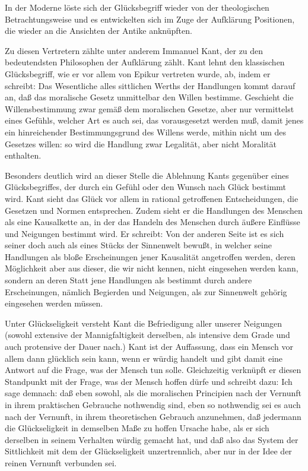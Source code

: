 In der Moderne löste sich der Glücksbegriff wieder von der theologischen Betrachtungsweise und es entwickelten sich im Zuge der Aufklärung Positionen, die wieder an die Ansichten der Antike anknüpften. 

Zu diesen Vertretern zählte unter anderem Immanuel Kant, der zu den bedeutendsten Philosophen der Aufklärung zählt. 
Kant lehnt den klassischen Glücksbegriff, wie er vor allem von Epikur vertreten wurde, ab, indem er schreibt: \glqq Das Wesentliche alles sittlichen Werths der Handlungen kommt darauf an, daß das moralische Gesetz unmittelbar den Willen bestimme. 
Geschieht die Willensbestimmung zwar gemäß dem moralischen Gesetze, aber nur vermittelst eines Gefühls, welcher Art es auch sei, das vorausgesetzt werden muß, damit jenes ein hinreichender Bestimmungsgrund des Willens werde, mithin nicht um des Gesetzes willen: so wird die Handlung zwar Legalität, aber nicht Moralität enthalten.\grqq{}\cite[S.\,71]{IK74}

Besonders deutlich wird an dieser Stelle die Ablehnung Kants gegenüber eines Glücksbegriffes, der durch ein Gefühl oder den Wunsch nach Glück bestimmt wird. 
Kant sieht das Glück vor allem in rational getroffenen Entscheidungen, die Gesetzen und Normen entsprechen. 
Zudem sieht er die Handlungen des Menschen als eine Kausalkette an, in der das Handeln des Menschen durch äußere Einflüsse und Neigungen bestimmt wird. 
Er schreibt: \glqq Von der anderen Seite ist es sich seiner doch auch als eines Stücks der Sinnenwelt bewußt, in welcher seine Handlungen als bloße Erscheinungen jener Kausalität angetroffen werden, deren Möglichkeit aber aus dieser, die wir nicht kennen, nicht eingesehen werden kann, sondern an deren Statt jene Handlungen als bestimmt durch andere Erscheinungen, nämlich Begierden und Neigungen, als zur Sinnenwelt gehörig eingesehen werden müssen.\grqq{}\cite[S.\,79f]{IK65}

Unter Glückseligkeit versteht Kant \glqq die Befriedigung aller unserer Neigungen (sowohl extensive der Mannigfaltigkeit derselben, als intensive dem Grade und auch protensive der Dauer nach.)\grqq{}\cite[S.\,523]{IK73} 
Kant ist der Auffassung, dass ein Mensch vor allem dann glücklich sein kann, wenn er würdig handelt und gibt damit eine Antwort auf die Frage, was der Mensch tun solle. 
Gleichzeitig verknüpft er diesen Standpunkt mit der Frage, was der Mensch hoffen dürfe und schreibt dazu: \glqq Ich sage demnach: daß eben sowohl, als die moralischen Principien nach der Vernunft in ihrem praktischen Gebrauche nothwendig sind, eben so nothwendig sei es auch nach der Vernunft, in ihrem theoretischen Gebrauch anzunehmen, daß jedermann die Glückseligkeit in demselben Maße zu hoffen Ursache habe, als er sich derselben in seinem Verhalten würdig gemacht hat, und daß also das System der Sittlichkeit mit dem der Glückseligkeit unzertrennlich, aber nur in der Idee der reinen Vernunft verbunden sei.\grqq{}\cite[S.\,525]{IK73}

